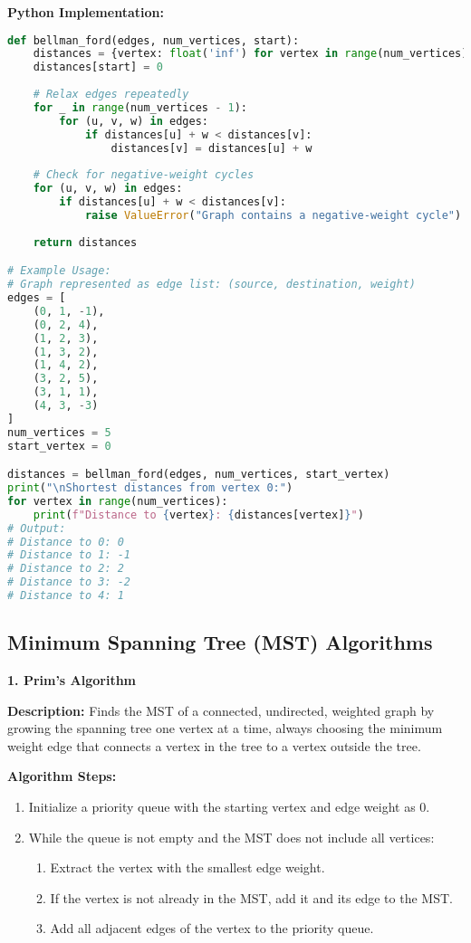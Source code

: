 \textbf{Python Implementation:}

\begin{lstlisting}[language=Python, xleftmargin=0.02\textwidth, xrightmargin=0.02\textwidth]
def bellman_ford(edges, num_vertices, start):
    distances = {vertex: float('inf') for vertex in range(num_vertices)}
    distances[start] = 0
    
    # Relax edges repeatedly
    for _ in range(num_vertices - 1):
        for (u, v, w) in edges:
            if distances[u] + w < distances[v]:
                distances[v] = distances[u] + w
    
    # Check for negative-weight cycles
    for (u, v, w) in edges:
        if distances[u] + w < distances[v]:
            raise ValueError("Graph contains a negative-weight cycle")
    
    return distances

# Example Usage:
# Graph represented as edge list: (source, destination, weight)
edges = [
    (0, 1, -1),
    (0, 2, 4),
    (1, 2, 3),
    (1, 3, 2),
    (1, 4, 2),
    (3, 2, 5),
    (3, 1, 1),
    (4, 3, -3)
]
num_vertices = 5
start_vertex = 0

distances = bellman_ford(edges, num_vertices, start_vertex)
print("\nShortest distances from vertex 0:")
for vertex in range(num_vertices):
    print(f"Distance to {vertex}: {distances[vertex]}")
# Output:
# Distance to 0: 0
# Distance to 1: -1
# Distance to 2: 2
# Distance to 3: -2
# Distance to 4: 1
\end{lstlisting}

\subsection{Minimum Spanning Tree (MST) Algorithms}

\textbf{1. Prim's Algorithm}

\textbf{Description:}  
Finds the MST of a connected, undirected, weighted graph by growing the spanning tree one vertex at a time, always choosing the minimum weight edge that connects a vertex in the tree to a vertex outside the tree.

\textbf{Algorithm Steps:}
\begin{enumerate}
    \item Initialize a priority queue with the starting vertex and edge weight as 0.
    \item While the queue is not empty and the MST does not include all vertices:
    \begin{enumerate}
        \item Extract the vertex with the smallest edge weight.
        \item If the vertex is not already in the MST, add it and its edge to the MST.
        \item Add all adjacent edges of the vertex to the priority queue.
    \end{enumerate}
\end{enumerate}


